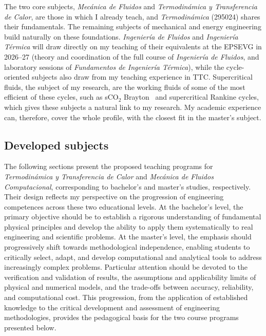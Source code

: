 \documentclass[11pt]{article}
\newcommand{\NEW}[1]{\iffinal #1\else{\color{red}#1}\fi}
\begin{document}
The two core subjects, \textit{Mecánica de Fluidos} and \textit{Termodinámica y Transferencia de Calor}\NEW{,} are those in which I already teach, and \textit{Termodin\'amica} (295024) shares their fundamentals. 
The remaining subjects of mechanical and energy engineering build naturally on these foundations. \textit{Ingeniería de Fluidos} and \textit{Ingeniería
Térmica} will draw directly on my teaching of their equivalents at the EPSEVG in 2026--27 (theory and coordination of the full course of \textit{Ingeniería de Fluidos}, and laboratory sessions of \textit{Fundamentos de Ingenier\'ia T\'ermica}), while the cycle-oriented subjects also draw from my teaching experience in TTC. 
Supercritical fluids, the subject of my research, are the working fluids of some of the most efficient of these cycles, such as sCO$_2$ Brayton~\cite{Ahn2015} and supercritical Rankine cycles, which gives these subjects a natural link to my research. 
My academic experience can, therefore, cover the whole profile, with the closest fit in the master's subject.

\subsection{Developed subjects}\label{sec:dev-approach}

The following sections present the proposed teaching \NEW{programs} for \textit{Termodinámica y Transferencia de Calor} and \textit{Mecánica de Fluidos Computacional}, corresponding to bachelor's and master's studies, respectively. 
Their design reflects my perspective on the progression of engineering \NEW{competences} across these two educational levels.
At the bachelor's level, the primary objective should be to establish a rigorous understanding of fundamental physical principles and develop the ability to apply them systematically to real engineering and scientific problems. 
At the master's level, the emphasis should progressively shift towards methodological independence, enabling students to critically select, adapt, and develop computational and analytical tools to address increasingly complex problems. 
Particular attention should be devoted to the verification and validation of results, the assumptions and applicability limits of physical and numerical models, and the trade-offs between accuracy, reliability, and computational cost. 
This progression, from the application of established knowledge to the critical development and assessment of engineering methodologies, provides the pedagogical basis for the two course \NEW{programs} presented below.
\end{document}
